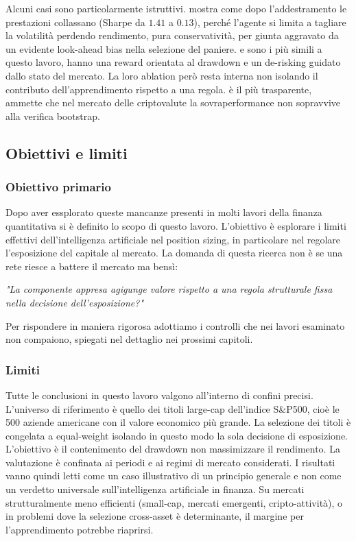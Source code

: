 Alcuni casi sono particolarmente istruttivi. \citet{lwele2025riskaware} mostra come dopo l'addestramento le prestazioni collassano (Sharpe da $1.41$ a $0.13$),
perché l'agente si limita a tagliare la volatilità perdendo rendimento, pura conservatività, per giunta aggravato da un evidente look-ahead bias nella
selezione del paniere. \citet{wang2021deeptrader} e \citet{chen2026mars} sono i più
simili a questo lavoro, hanno una reward orientata al drawdown e un de-risking guidato
dallo stato del mercato. La loro ablation però resta interna non isolando il contributo
dell'apprendimento rispetto a una regola. \citet{jung2025factor} è il più trasparente, ammette che nel mercato delle criptovalute
la sovraperformance non sopravvive alla verifica bootstrap.







\subsection{Obiettivi e limiti}
\label{subsec:scope}

\subsubsection{Obiettivo primario}
Dopo aver essplorato queste mancanze presenti in molti lavori della finanza quantitativa si è definito lo scopo di questo lavoro.
L'obiettivo è esplorare i limiti effettivi dell'intelligenza artificiale nel position sizing, in particolare nel regolare l'esposizione del capitale al mercato.
La domanda di questa ricerca non è se una rete riesce a battere il mercato ma bensì:

\emph{"La componente appresa agigunge valore rispetto a una regola strutturale fissa nella decisione dell'esposizione?"}

Per rispondere in maniera rigorosa adottiamo i controlli che nei lavori esaminato non compaiono, spiegati nel dettaglio nei prossimi capitoli.



\subsubsection{Limiti}
Tutte le conclusioni in questo lavoro valgono all'interno di confini precisi.
L'universo di riferimento è quello dei titoli large-cap dell'indice S\&P500, cioè le 500 aziende americane con il valore economico più grande.
La selezione dei titoli è congelata a equal-weight isolando in questo modo la sola decisione di esposizione.
L'obiettivo è il contenimento del drawdown non massimizzare il rendimento.
La valutazione è confinata ai periodi e ai regimi di mercato considerati.
I risultati vanno quindi letti come un caso illustrativo di un principio generale e non come un verdetto universale sull'intelligenza artificiale in finanza.
Su mercati
strutturalmente meno efficienti (small-cap, mercati emergenti, cripto-attività), o
in problemi dove la selezione cross-asset è determinante, il margine per
l'apprendimento potrebbe riaprirsi.

